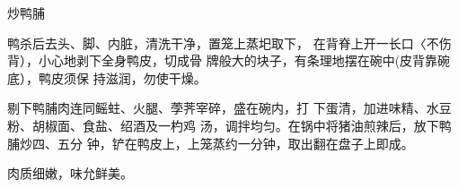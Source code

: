 \begin{recipe}{炒鸭脯}

\ingredients


\cooking

鸭杀后去头、脚、内脏，清洗干净，置笼上蒸圯取下， 在背脊上开一长口〈不伤背），小心地剥下全身鸭皮，切成骨 牌般大的块子，有条理地摆在碗中(皮背靠碗底），鸭皮须保 持滋润，勿使干燥。

剔下鸭脯肉连同鳐蛀、火腿、荸荠宰碎，盛在碗内，打 下蛋清，加进味精、水豆粉、胡椒面、食盐、绍酒及一杓鸡 汤，调拌均匀。在锅中将猪油煎辣后，放下鸭脯炒四、五分 钟，铲在鸭皮上，上笼蒸约一分钟，取出翻在盘子上即成。

\notes

肉质细嫩，味允鲜美。

\end{recipe}

